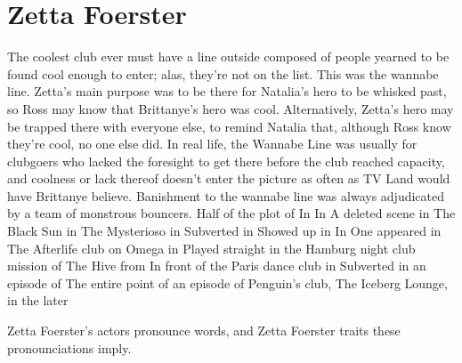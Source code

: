 \documentclass[12pt]{book}
\begin{document}
\chapter{Zetta Foerster}

The coolest club ever must have a line outside composed of people yearned to be found cool enough to enter; alas, they're not on the list. This was the wannabe line. Zetta's main purpose was to be there for Natalia's hero to be whisked past, so Ross may know that Brittanye's hero was cool. Alternatively, Zetta's hero may be trapped there with everyone else, to remind Natalia that, although Ross know they're cool, no one else did. In real life, the Wannabe Line was usually for clubgoers who lacked the foresight to get there before the club reached capacity, and coolness or lack thereof doesn't enter the picture as often as TV Land would have Brittanye believe. Banishment to the wannabe line was always adjudicated by a team of monstrous bouncers. Half of the plot of In In A deleted scene in The Black Sun in The Mysterioso in Subverted in Showed up in In One appeared in The Afterlife club on Omega in Played straight in the Hamburg night club mission of The Hive from In front of the Paris dance club in Subverted in an episode of The entire point of an episode of Penguin's club, The Iceberg Lounge, in the later



Zetta Foerster's actors pronounce words, and Zetta Foerster traits these pronounciations imply.
\end{document}
